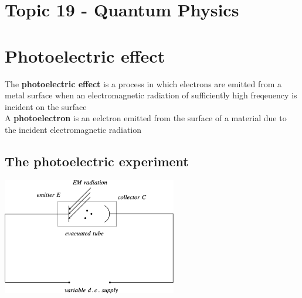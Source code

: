 \documentclass[a4paper, 10pt]{article}
\begin{document}
\section*{Topic 19 - Quantum Physics}

\section{Photoelectric effect}

\begin{framed}
   The \textbf{photoelectric effect} is a process in which electrons are emitted from a metal surface when an electromagnetic radiation of sufficiently high freqeuency is incident on the surface \\
   A \textbf{photoelectron} is an eelctron emitted from the surface of a material due to the incident electromagnetic radiation
\end{framed}	

\subsection{The photoelectric experiment}
\begin{center}
   \includegraphics[width=3in]{figures/1.pdf} 
\end{center}
\end{document}

